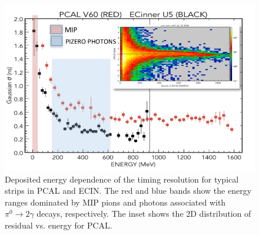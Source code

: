 \begin{figure}[hbt]
\centering
\includegraphics[width=1.0\columnwidth,keepaspectratio]{img/S9_2_2.png}
\caption[]{Deposited energy dependence of the timing resolution for typical strips in PCAL and ECIN. The red
  and blue bands show the energy ranges dominated by MIP pions and photons associated with $\pi^0 \to 2\gamma$
  decays, respectively. The inset shows the 2D distribution of residual vs. energy for PCAL.}
\label{fig:S9_2_2}
\end{figure}


